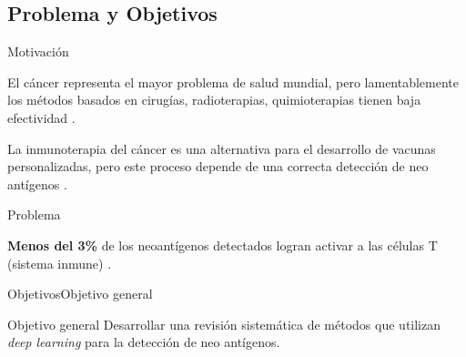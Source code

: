 \documentclass[10pt]{beamer}
\newcommand{\1}{
	\setbeamertemplate{background}{
		\texttt{[image: img/1]}
		\tikz[overlay] \fill[fill opacity=0.75,fill=white] (0,0) rectangle (-\paperwidth,\paperheight);
	}
}
\begin{document}
\subsection{Problema y Objetivos}

\begin{frame}{Motivación}{}	

\begin{block}{}
	El cáncer representa el mayor problema de salud mundial, pero lamentablemente los métodos basados en cirugías, radioterapias, quimioterapias tienen baja efectividad \cite{peng2019neoantigen}.
\end{block}	

\begin{block}{}
	La inmunoterapia del cáncer es una alternativa para el desarrollo de vacunas personalizadas, pero este proceso depende de una correcta detección de neo antígenos \cite{de2020neoantigen, peng2019neoantigen}.
\end{block}

\end{frame}



\begin{frame}{Problema}{}
	
\begin{block}{}
	\textbf{Menos del 3\%} de los neoantígenos detectados logran activar a las células T (sistema inmune) \cite{de2020neoantigen}. 
\end{block}
	
\end{frame}

\begin{frame}{Objetivos}{Objetivo general}	
	\begin{block}{Objetivo general}
		Desarrollar una revisión sistemática de métodos que utilizan \textit{deep learning} para la detección de neo antígenos.
	\end{block}	
\end{frame}
\end{document}
